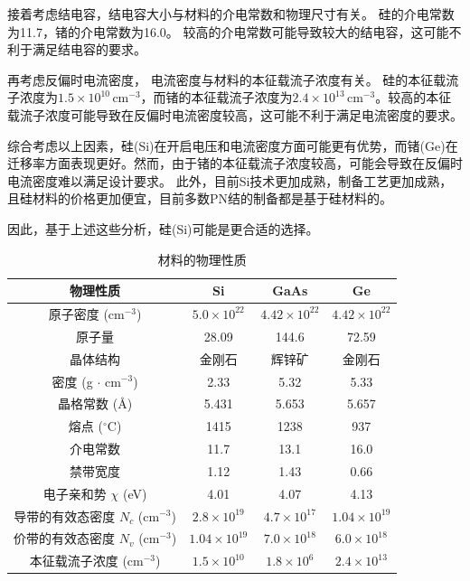 \documentclass[12pt,hyperref,a4paper,UTF8]{ctexart}
\begin{document}
接着考虑结电容，结电容大小与材料的介电常数和物理尺寸有关。
硅的介电常数为11.7，锗的介电常数为16.0。
较高的介电常数可能导致较大的结电容，这可能不利于满足结电容的要求。

再考虑反偏时电流密度，
电流密度与材料的本征载流子浓度有关。
硅的本征载流子浓度为\(1.5 \times 10^{10} \, \text{cm}^{-3}\)，而锗的本征载流子浓度为\(2.4 \times 10^{13} \, \text{cm}^{-3}\)。较高的本征载流子浓度可能导致在反偏时电流密度较高，这可能不利于满足电流密度的要求。

综合考虑以上因素，硅(Si)在开启电压和电流密度方面可能更有优势，而锗(Ge)在迁移率方面表现更好。然而，由于锗的本征载流子浓度较高，可能会导致在反偏时电流密度难以满足设计要求。
此外，目前Si技术更加成熟，制备工艺更加成熟，且硅材料的价格更加便宜，目前多数PN结的制备都是基于硅材料的。

因此，基于上述这些分析，硅(Si)可能是更合适的选择。


\begin{table}[H]
\centering
\begin{tabular}{|c|c|c|c|}
\hline
物理性质 & Si & GaAs & Ge \\ \hline
原子密度 (cm$^{-3}$) & $5.0 \times 10^{22}$ & $4.42 \times 10^{22}$ & $4.42 \times 10^{22}$ \\ \hline
原子量 & 28.09 & 144.6 & 72.59 \\ \hline
晶体结构 & 金刚石 & 辉锌矿 & 金刚石 \\ \hline
密度 (g $\cdot$ cm$^{-3}$) & 2.33 & 5.32 & 5.33 \\ \hline
晶格常数 (\AA) & 5.431 & 5.653 & 5.657 \\ \hline
熔点 ($^{\circ}$C) & 1415 & 1238 & 937 \\ \hline
介电常数 & 11.7 & 13.1 & 16.0 \\ \hline
禁带宽度 & 1.12 & 1.43 & 0.66 \\ \hline
电子亲和势 $\chi$ (eV) & 4.01 & 4.07 & 4.13 \\ \hline
导带的有效态密度 $N_c$ (cm$^{-3}$) & $2.8 \times 10^{19}$ & $4.7 \times 10^{17}$ & $1.04 \times 10^{19}$ \\ \hline
价带的有效态密度 $N_v$ (cm$^{-3}$) & $1.04 \times 10^{19}$ & $7.0 \times 10^{18}$ & $6.0 \times 10^{18}$ \\ \hline
本征载流子浓度 (cm$^{-3}$) & $1.5 \times 10^{10}$ & $1.8 \times 10^6$ & $2.4 \times 10^{13}$ \\ \hline
\end{tabular}
\caption{材料的物理性质}
\end{table}
\end{document}
